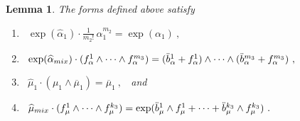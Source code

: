 \documentclass[10pt,a4paper]{amsart}
\newtheorem{lemma}{Lemma}
\begin{document}
\begin{lemma} \label{lem:formsdefined}
The forms defined above satisfy
    \begin{enumerate}
        \item \ $\displaystyle \exp(\widehat \alpha_1) \cdot \frac{1}{m_2!}\,\alpha_1^{m_2} = \exp(\alpha_1) \ , $ \\
        \item \ $\exp(\widehat \alpha_{\rm mix}) \cdot ( f_\alpha^1 \wedge \cdots \wedge f_\alpha^{m_3}) = (\ddot b_\alpha^1 + f_\alpha^1) \wedge \cdots \wedge (\ddot b_\alpha^{m_3} + f_\alpha^{m_3}) \ , $ \\[-3mm]
        \item \ $\widehat \mu_1 \cdot(\mu_1 \wedge \overline{\mu}_1) = \overline{\mu}_1 \ , $ \ and \\[-3mm]
        \item \ $\widehat\mu_{\rm mix} \cdot (f_\mu^1 \wedge \cdots \wedge f_\mu^{k_3}) = \exp(\ddot{b}_\mu^1 \wedge f_\mu^1 + \cdots +\ddot{b}_\mu^{k_3} \wedge f_\mu^{k_3}) \ .$
    \end{enumerate}
\end{lemma}
\end{document}
